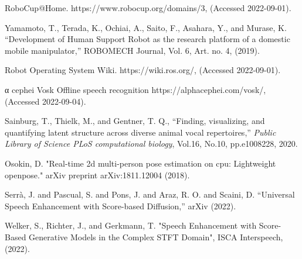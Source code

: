 \documentclass[a4j]{jarticle}
\begin{document}
\begin{thebibliography}{99}

RoboCup@Home. https://www.robocup.org/domains/3, (Accessed 2022-09-01).

Yamamoto, T., Terada, K., Ochiai, A., Saito, F., Asahara, Y., and Murase, K. “Development of Human Support Robot as the research platform of a domestic mobile manipulator,” ROBOMECH Journal, Vol. 6, Art. no. 4, (2019).


Robot Operating System Wiki. https://wiki.ros.org/, (Accessed 2022-09-01).


α cephei Vosk Offline speech recognition https://alphacephei.com/vosk/, (Accessed 2022-09-04).


Sainburg, T., Thielk, M., and Gentner, T. Q.,
“Finding, visualizing, and quantifying latent structure across diverse animal vocal repertoires,”
{\it Public Library of Science PLoS computational biology},
Vol.16,
No.10,
pp.e1008228,
2020.

Osokin, D. "Real-time 2d multi-person pose estimation on cpu: Lightweight openpose." arXiv preprint arXiv:1811.12004 (2018).

Serrà, J. and Pascual, S. and Pons, J. and Araz, R. O. and Scaini, D. “Universal Speech Enhancement with Score-based Diffusion,” arXiv (2022).

Welker, S., Richter, J., and Gerkmann, T. "Speech Enhancement with Score-Based Generative Models in the Complex STFT Domain", ISCA Interspeech, (2022).


\end{thebibliography}
\end{document}
